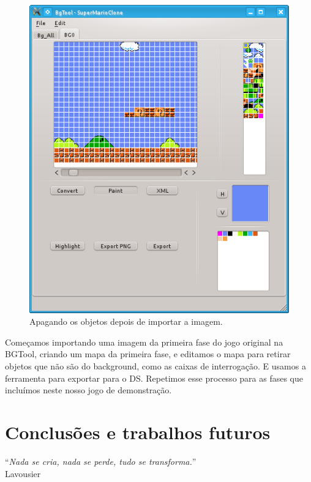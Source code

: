\documentclass[brazil]{abnt}
\begin{document}
\begin{figure}[h!]
\centering
\includegraphics{imgs/bgtool2.png}
\caption{Apagando os objetos depois de importar a imagem.} 
\end{figure}

Começamos importando uma imagem da primeira fase do jogo original na BGTool, criando um mapa da primeira fase, e editamos o mapa para retirar objetos que não são do background, como as caixas de interrogação. E usamos a ferramenta para exportar para o DS. Repetimos esse processo para as fases que incluímos neste nosso jogo de demonstração.



\chapter{Conclusões e trabalhos futuros\label{cap:conclusao}}

\vfill{}
\begin{flushright}{}``\emph{Nada se cria, nada se perde, tudo se
transforma.}''\\
{\small Lavousier}\end{flushright}{\small \par}
\vfill{}
\end{document}

